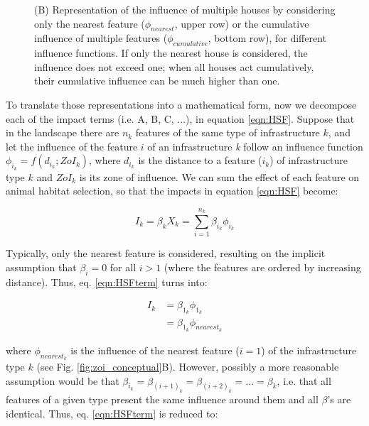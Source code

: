 \documentclass[titlepage]{article}
\begin{document}
\begin{figure}[!htbp]
{%
(B) Representation of the influence of multiple houses by considering only the nearest feature ($\phi_{nearest}$, upper row) or the cumulative influence of multiple features ($\phi_{cumulative}$, bottom row), for different influence functions. If only the nearest house is considered, the influence does not exceed one; when all houses act cumulatively, their cumulative influence can be much higher than one.}
\end{figure}

To translate those representations into a mathematical form, now we decompose each of the impact terms (i.e. A, B, C, ...), in equation \ref{eqn:HSF}. Suppose that in the landscape there are $n_k$ features of the same type of infrastructure $k$, and let the influence of the feature $i$ of an infrastructure \textit{k} follow an influence function \citep[or ``weighting function", ][]{miguet_how_2017} $\phi_{i_k} = f(d_{i_k}; ZoI_k)$, where $d_{i_k}$ is the distance to a feature ($i_k$) of infrastructure type $k$ and $ZoI_k$ is its zone of influence. We can sum the effect of each feature on animal habitat selection, so that the impacts in equation \ref{eqn:HSF} become:

\begin{equation}
\label{eqn:HSFterm}
    I_k = \beta_k X_k = \sum_{i=1}^{n_k} \beta_{i_k} \phi_{i_k}
\end{equation}

Typically, only the nearest feature is considered, resulting on the implicit assumption that $\beta_i = 0$ for all $i > 1$ (where the features are ordered by increasing distance). Thus, eq. \ref{eqn:HSFterm} turns into:

\begin{equation}
\label{eqn:HSFnearest}
\begin{split}
    I_k & = \beta_{1_k} \phi_{1_k} \\
        & = \beta_{1_k} \phi_{nearest_k}
\end{split}                
\end{equation}

where $\phi_{nearest_k}$ is the influence of the nearest feature ($i = 1$) of the infrastructure type $k$ (see Fig. \ref{fig:zoi_conceptual}B). However, possibly a more reasonable assumption would be that $\beta_{i_k} = \beta_{{(i+1)}_k} = \beta_{{(i+2)}_k} = ... = \beta_k$, i.e. that all features of a given type present the same influence around them and all $\beta$'s are identical. Thus, eq. \ref{eqn:HSFterm} is reduced to:
\end{document}
